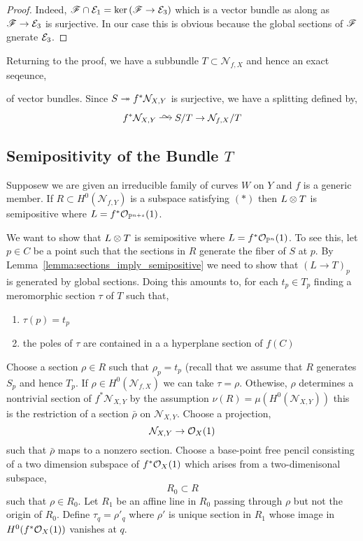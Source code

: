 \documentclass[12pt]{article}
\newcommand{\cN}{\mathcal{N}}
\begin{document}
\begin{proof}
Indeed, $\mathscr{F} \cap \mathcal{E}_1 = \ker{(\mathscr{F}\to \mathcal{E}_3)}$ which is a vector bundle as along as $\mathscr{F} \to \mathcal{E}_3$ is surjective. In our case this is obvious because the global sections of $\mathscr{F}$ gnerate $\mathcal{E}_3$. 
\end{proof}

Returning to the proof, we have a subbundle $T \subset \cN_{f,X}$ and hence an exact seqeunce,
\begin{center}
\end{center}
of vector bundles. Since $S \onto f^* \cN_{X,Y}$ is surjective, we have a splitting defined by,
\[ f^* \cN_{X,Y} \iso S / T \to \cN_{f,X} / T \]

\subsection{Semipositivity of the Bundle $T$}

\begin{theorem}
Supposew we are given an irreducible family of curves $W$ on $Y$ and $f$ is a generic member. If $R \subset H^0(\cN_{f,Y})$ is a subspace satisfying $(\ast)$ then $L \otimes T$ is semipositive where $L = f^* \mathcal{O}_{\mathbb{P}^{n+s}}(1)$.
\end{theorem}

We want to show that $L \otimes T$ is semipositive where $L = f^* \mathcal{O}_{\mathbb{P}^n}(1)$. To see this, let $p \in C$ be a point such that the sections in $R$ generate the fiber of $S$ at $p$. By Lemma~\ref{lemma:sections_imply_semipositive} we need to show that $(L \to T)_p$ is generated by global sections. Doing this amounts to, for each $t_p \in T_p$ finding a meromorphic section $\tau$ of $T$ such that,
\begin{enumerate}
\item $\tau(p) = t_p$
\item the poles of $\tau$ are contained in a a hyperplane section of $f(C)$
\end{enumerate}
Choose a section $\rho \in R$ such that $\rho_p = t_p$ (recall that we assume that $R$ generates $S_p$ and hence $T_p$. If $\rho \in H^0(\cN_{f, X})$ we can take $\tau = \rho$. Othewise, $\rho$ determines a nontrivial section of $f^* \cN_{X,Y}$ by the assumption $\nu(R) = \mu(H^0(\cN_{X,Y}))$ this is the restriction of a section $\bar{\rho}$ on $\cN_{X,Y}$. Choose a projection,
\[ \cN_{X,Y} \to \struct{X}(1) \]
such that $\bar{\rho}$ maps to a nonzero section. Choose a base-point free pencil consisting of a two dimension subspace of $f^* \mathcal{O}_{X}(1)$ which arises from a two-dimenisonal subspace,
\[ R_0 \subset R \]
such that $\rho \in R_0$. {\color{red} Let $R_1$ be an affine line in $R_0$ passing through $\rho$ but not the origin of $R_0$. Define $\tau_q = \rho'_q$ where $\rho'$ is unique section in $R_1$ whose image in $H^0(f^* \mathcal{O}_{X}(1))$ vanishes at $q$.}
\end{document}
